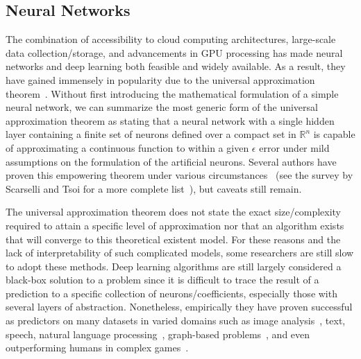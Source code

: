 \subsection{Neural Networks}

The combination of accessibility to cloud computing architectures, large-scale data collection/storage, and advancements in GPU processing has made neural networks and deep learning both feasible and widely available.
%
As a result, they have gained immensely in popularity due to the universal approximation theorem~\cite{Cybenko1989,Funahashi1989,Hecht-Nielsen1987,HornikStinchcombeWhite1989}.
%
Without first introducing the mathematical formulation of a simple neural network, we can summarize the most generic form of the universal approximation theorem as stating that a neural network with a single hidden layer containing a finite set of neurons defined over a compact set in $\mathbb{R}^n$ is capable of approximating a continuous function to within a given $\epsilon$ error under mild assumptions on the formulation of the artificial neurons.
%
Several authors have proven this empowering theorem under various circumstances~\cite{Hornik1991,Hornik1993,Huang2003,HuangBabri1998,IrieMiyake1988,Kurkova1992,LeshnoLinPinkus1993,ParkSandberg1991} (see the survey by Scarselli and Tsoi for a more complete list~\cite{ScarselliTsoi1998}), but caveats still remain.

The universal approximation theorem does not state the exact size/complexity required to attain a specific level of approximation nor that an algorithm exists that will converge to this theoretical existent model.
%
For these reasons and the lack of interpretability of such complicated models, some researchers are still slow to adopt these methods.
%
Deep learning algorithms are still largely considered a black-box solution to a problem since it is difficult to trace the result of a prediction to a specific collection of neurons/coefficients, especially those with several layers of abstraction.
%
Nonetheless, empirically they have proven successful as predictors on many datasets in varied domains such as image analysis~\cite{Daugman1988,FarabetCouprieNajman2012,HadsellSermanetPierre2009,KrizhevskySutskeverHinton2017,MillertariNavabAhmadi2016,YasminSharifMohsin2013}, text, speech, natural language processing~\cite{BengioDucharmeVincent2003,GravesMohamedHinton2013,GravesWayneDanihelka2014,HochreiterSchmidhuber1997,MaPrincipe2019,SutskeverVinyalsLe2014}, graph-based problems~\cite{WuPanChen2019,ZhangCuiZhu2018,ZhouCuiZhang2018}, and even outperforming humans in complex games~\cite{MnihKavukcuogluSilver2013,SilverHuangMaddison2016}.

